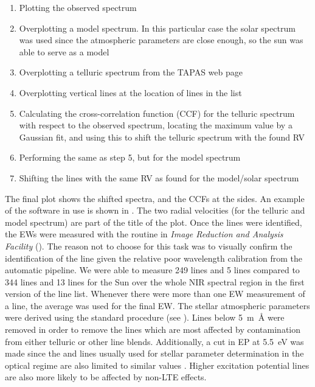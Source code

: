 \begin{enumerate}
  \item Plotting the observed spectrum
  \item Overplotting a model spectrum. In this particular case the solar spectrum was used since the
        atmospheric parameters are close enough, so the sun was able to serve as a model
  \item Overplotting a telluric spectrum from the TAPAS web page \citep{Bertaux2014}
  \item Overplotting vertical lines at the location of lines in the list
  \item Calculating the cross-correlation function (CCF) for the telluric spectrum with respect to
        the observed spectrum, locating the maximum value by a Gaussian fit, and using this to shift
        the telluric spectrum with the found RV
  \item Performing the same as step 5, but for the model spectrum
  \item Shifting the lines with the same RV as found for the model/solar spectrum
\end{enumerate}

The final plot shows the shifted spectra, and the CCFs at the sides. An example of the software in
use is shown in . The two radial velocities (for the telluric and
model spectrum) are part of the title of the plot. Once the lines were identified, the EWs were
measured with the  routine in \emph{Image Reduction and Analysis Facility}
(). The reason not to choose \ARES for this task was to visually confirm the
identification of the line given the relative poor wavelength calibration from the automatic
pipeline. We were able to measure 249  lines and 5  lines compared to 344
 lines and 13  lines for the Sun over the whole NIR spectral region in the
first version of the line list. Whenever there were more than one EW measurement of a line, the
average was used for the final EW. The stellar atmospheric parameters were derived using the
standard procedure (see ). Lines below \SI{5}{m\angstrom} were removed in order
to remove the lines which are most affected by contamination from either telluric or other line
blends. Additionally, a cut in EP at \SI{5.5}{eV} was made since the  and 
lines usually used for stellar parameter determination in the optical regime are also limited to
similar values \citep[see e.g][]{Sousa2008a}. Higher excitation potential lines are also more likely
to be affected by non-LTE effects.

